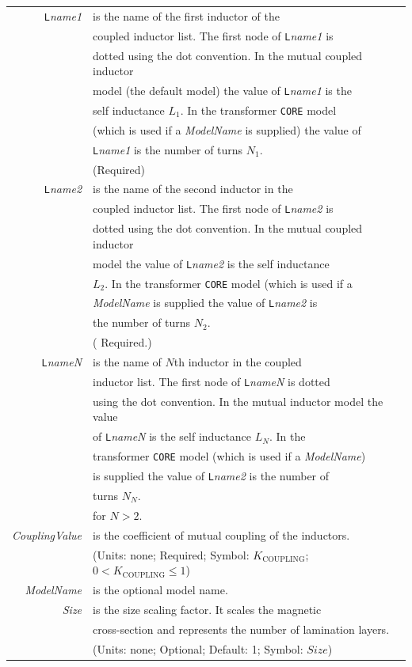 \documentclass{article}
\begin{document}
\begin{tabular}{r l}
{\tt L}{\it name1} & is the name of the first inductor of the\\
& coupled inductor list. The first node of {\tt L}{\it name1} is\\
& dotted using the dot convention. In the mutual coupled
inductor\\
& model (the default model) the value of {\tt L}{\it name1} is
the\\
& self inductance $L_1$. In the transformer {\tt CORE} model\\
& (which is used if a {\it ModelName} is supplied) the value of\\
& {\tt L}{\it name1} is the number of turns $N_1$.\\
& (Required)\\
{\tt L}{\it name2} & is the name of the second inductor in the\\
& coupled inductor list. The first node of {\tt L}{\it name2} is\\
& dotted using the dot convention. In the mutual coupled
inductor\\
& model the value of {\tt L}{\it name2} is the self inductance\\
& $L_2$. In the transformer {\tt CORE} model (which is used if a\\
& {\it ModelName} is supplied the value of {\tt L}{\it name2} is\\
& the number of turns $N_2$.\\
& ( Required.)\\
{\tt L}{\it nameN} & is the name of $N$th inductor in the
coupled\\
& inductor list. The first node of {\tt L}{\it nameN} is dotted\\
& using the dot convention. In the mutual inductor model the
value\\
& of {\tt L}{\it nameN} is the self inductance $L_N$. In the\\
& transformer {\tt CORE} model (which is used if a {\it
ModelName})\\
& is supplied the value of {\tt L}{\it name2} is the number of\\
& turns $N_N$. \\
&  for $N > 2$.\\
{\it CouplingValue} & is the coefficient of mutual coupling of
the inductors.\\
& (Units: none; Required; Symbol: $K_{\mathrm{COUPLING}}$; $ 0 <
K_{\mathrm{COUPLING}} \le 1$)\\
{\it ModelName} & is the optional model name.\\
{\it Size} & is the size scaling factor. It scales the magnetic\\
& cross-section and represents the number of lamination layers.\\
               & (Units: none; Optional; Default: 1; Symbol: $Size$)
\end{tabular}
\end{document}
